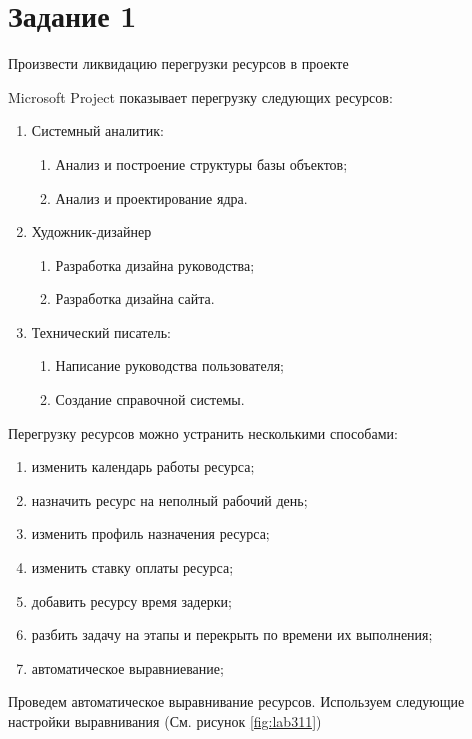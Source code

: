 \section{Задание 1}

Произвести ликвидацию перегрузки ресурсов в проекте

Microsoft Project показывает перегрузку следующих ресурсов:
\begin{enumerate}
	\item Системный аналитик:
	\begin{enumerate}
		\item Анализ и построение структуры базы объектов;
		\item Анализ и проектирование ядра.
	\end{enumerate}
	\item Художник-дизайнер
	\begin{enumerate}
		\item Разработка дизайна руководства;
		\item Разработка дизайна сайта.
	\end{enumerate}
	\item Технический писатель:
	\begin{enumerate}
		\item Написание руководства пользователя;
		\item Создание справочной системы.
	\end{enumerate}
\end{enumerate}

Перегрузку ресурсов можно устранить несколькими способами:
\begin{enumerate}
	\item изменить календарь работы ресурса;
	\item назначить ресурс на неполный рабочий день;
	\item изменить профиль назначения ресурса;
	\item изменить ставку оплаты ресурса;
	\item добавить ресурсу время задерки;
	\item разбить задачу на этапы и перекрыть по времени их выполнения;
	\item автоматическое выравниевание;
\end{enumerate}

Проведем автоматическое выравнивание ресурсов. Используем следующие настройки выравнивания (См. рисунок \ref{fig:lab311})

